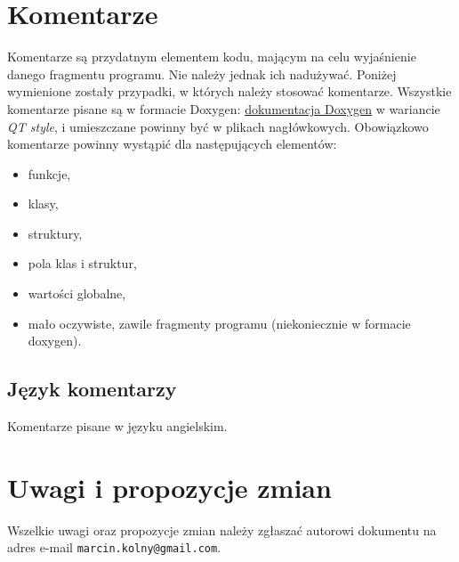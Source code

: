 \documentclass[titlepage]{article}
\makeatletter
\newcommand{\authoremail}{\texttt{marcin.kolny@gmail.com}}
\makeatother
\begin{document}
\section{Komentarze}
Komentarze są przydatnym elementem kodu, mającym na celu wyjaśnienie danego fragmentu programu. Nie należy jednak ich nadużywać. Poniżej wymienione zostały przypadki, w których należy stosować komentarze. 
Wszystkie komentarze pisane są w formacie Doxygen: \href{http://doxygen.org/}{dokumentacja Doxygen} w wariancie \textit{QT style}, i umieszczane powinny być w plikach nagłówkowych.
Obowiązkowo komentarze powinny wystąpić dla następujących elementów:
\begin{itemize}
\item funkcje,
\item klasy,
\item struktury,
\item pola klas i struktur,
\item wartości globalne,
\item mało oczywiste, zawile fragmenty programu (niekoniecznie w formacie doxygen).
\end{itemize}

\subsection{Język komentarzy}
Komentarze pisane w języku angielskim.
\section{Uwagi i propozycje zmian}
Wszelkie uwagi oraz propozycje zmian należy zgłaszać autorowi dokumentu na adres e-mail \authoremail.
\end{document}
